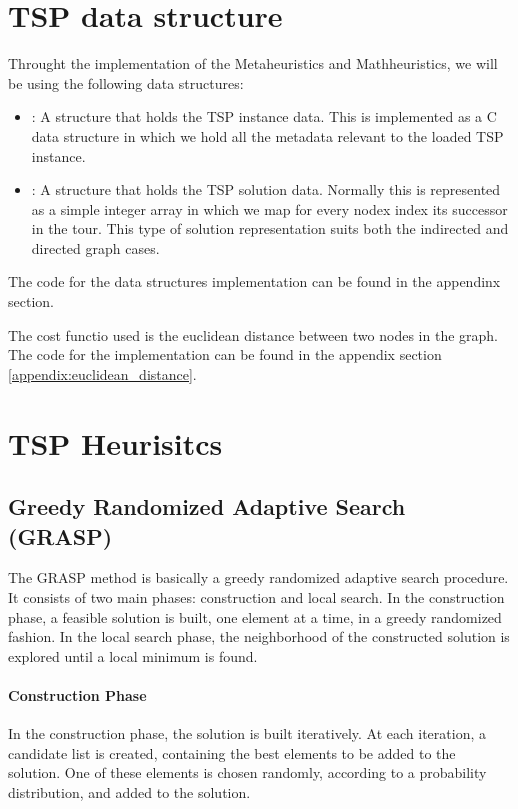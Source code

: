 \documentclass{article}
\begin{document}
\section{TSP data structure}
Throught the implementation of the Metaheuristics and Mathheuristics, we will be using the following data structures:
\begin{itemize}
	\item {} : A structure that holds the TSP instance data. This is implemented as a C data structure
	      in which we hold all the metadata relevant to the loaded TSP instance.
	\item {} : A structure that holds the TSP solution data. Normally this is represented as a simple integer array in which we map for every nodex
	      index its successor in the tour. This type of solution representation suits both the indirected and directed graph cases.
\end{itemize}
The code for the data structures implementation can be found in the appendinx section.

The cost functio used is the euclidean distance between two nodes in the graph.
The code for the implementation can be found in the appendix section \ref{appendix:euclidean_distance}.

\section{TSP Heurisitcs}

\subsection{Greedy Randomized Adaptive Search (GRASP)}
The GRASP method is basically a greedy randomized adaptive search procedure.
It consists of two main phases: construction and local search.
In the construction phase, a feasible solution is built, one element at a time, in a greedy randomized fashion.
In the local search phase, the neighborhood of the constructed solution is explored until a local minimum is found.

\paragraph{Construction Phase}
In the construction phase, the solution is built iteratively. At each iteration, a candidate list is created,
containing the best elements to be added to the solution. One of these elements is chosen randomly, according
to a probability distribution, and added to the solution.
\end{document}
